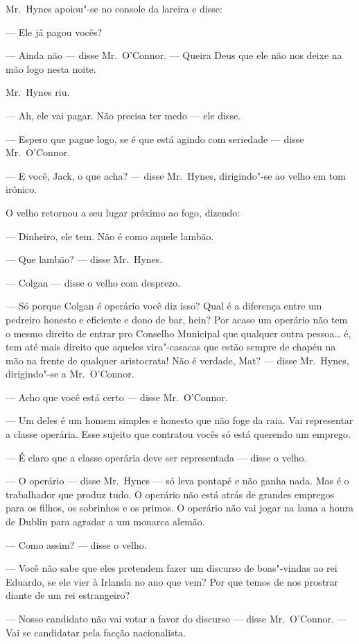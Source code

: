 Mr.~Hynes apoiou"-se no console da lareira e disse:

--- Ele já pagou vocês?

--- Ainda não --- disse Mr.~O’Connor.  --- Queira Deus que ele não nos deixe na
mão logo nesta noite.

Mr.~Hynes riu.

--- Ah, ele vai pagar.  Não precisa ter medo --- ele disse.

--- Espero que pague logo, se é que está agindo com seriedade --- disse Mr.~O’Connor.

--- E você, Jack, o que acha? --- disse Mr.~Hynes, dirigindo"-se ao velho em tom
irônico.

O velho retornou a seu lugar próximo ao fogo, dizendo:

--- Dinheiro, ele tem.  Não é como aquele lambão.

--- Que lambão? --- disse Mr.~Hynes.

--- Colgan --- disse o velho com desprezo.

--- Só porque Colgan é operário você diz isso?  Qual é a diferença entre um
pedreiro honesto e eficiente e dono de bar, hein?  Por acaso um operário não
tem o mesmo direito de entrar pro Conselho Municipal que qualquer outra
pessoa\ldots{} é, tem até mais direito que aqueles vira"-casacas que estão
sempre de chapéu na mão na frente de qualquer aristocrata!  Não é verdade, Mat?
--- disse Mr.~Hynes, dirigindo"-se a Mr.~O’Connor.

--- Acho que você está certo --- disse Mr.~O’Connor.

--- Um deles é um homem simples e honesto que não foge da raia.  Vai
representar a classe operária.  Esse sujeito que contratou vocês só está
querendo um emprego.

--- É claro que a classe operária deve ser representada --- disse o velho.

--- O operário --- disse Mr.~Hynes --- só leva pontapé e não ganha nada.  Mas é
o trabalhador que produz tudo.  O operário não está atrás de grandes empregos
para os filhos, os sobrinhos e os primos.  O operário não vai jogar na lama a
honra de Dublin para agradar a um monarca alemão.

--- Como assim? --- disse o velho.

--- Você não sabe que eles pretendem fazer um discurso de boas"-vindas ao rei
Eduardo, se ele vier à Irlanda no ano que vem?  Por que temos de nos prostrar
diante de um rei estrangeiro?

--- Nosso candidato não vai votar a favor do discurso --- disse Mr.~O’Connor.
--- Vai se candidatar pela facção nacionalista.

